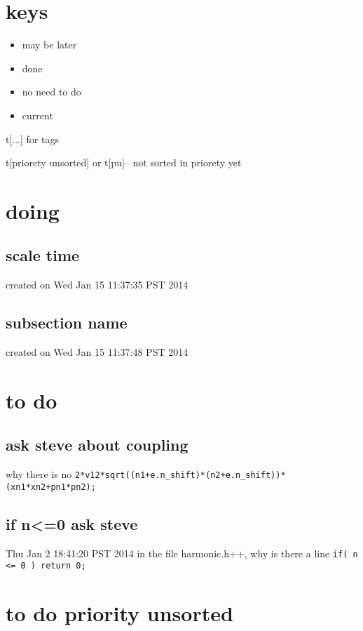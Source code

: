 \documentclass{article}
\let\Item\item
\renewcommand\item{\normalcolor\Item}
\newcommand\ml{\color[RGB]{153, 150, 204}} %
\newcommand\nn{\color[RGB]{124, 124, 255}} %
\newcommand\done{\color[RGB]{129, 180, 185} \ding{52} }
\newcommand\now{\color[RGB]{255, 0, 0}} %
\begin{document}
\section{keys}
\begin{itemize}
  \item \ml may be later
  \item \done done
  \item \nn no need to do
  \item \now current 
\end{itemize}

t[...] for tags

t[priorety unsorted] or t[pu]-- not sorted in priorety yet

\section{doing}
\subsection{scale time}
created on Wed Jan 15 11:37:35 PST 2014
\label{sub:scale_time}

\subsection{subsection name}
created on Wed Jan 15 11:37:48 PST 2014
\label{sub:subsection_name}

\section{to do}
\subsection{ask steve about coupling}
\label{sub:ask_steve_about_coupling}
why there is no \verb`2*v12*sqrt((n1+e.n_shift)*(n2+e.n_shift))*(xn1*xn2+pn1*pn2);`
\subsection{if n<=0 ask steve}
Thu Jan  2 18:41:20 PST 2014
\label{sub:if_n_0_ask_steve}
in the file harmonic.h++, why is there a line \verb`if( n <= 0 ) return 0;`
\section{to do priority unsorted}
\end{document}
